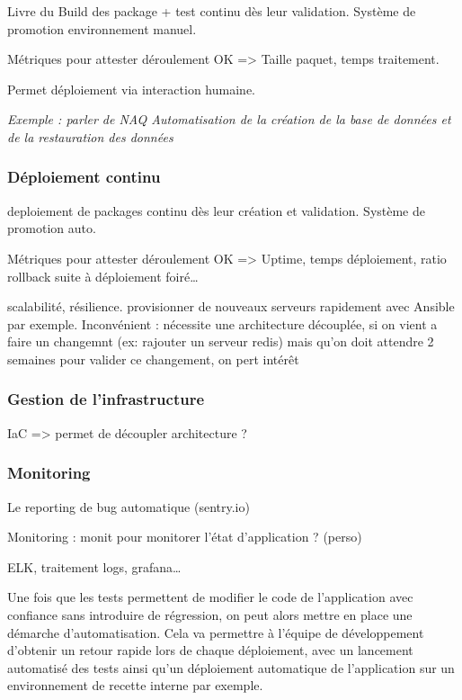 Livre du Build des package + test continu dès leur validation. Système de promotion environnement manuel.

Métriques pour attester déroulement OK => Taille paquet, temps traitement. 

Permet déploiement via interaction humaine.

\textit{Exemple : parler de NAQ Automatisation de la création de la base de données et de la restauration des données}

\subsubsection{Déploiement continu}

deploiement de packages continu dès leur création et validation. Système de promotion auto.

Métriques pour attester déroulement OK => Uptime, temps déploiement, ratio rollback suite à déploiement foiré\ldots

scalabilité, résilience. provisionner de nouveaux serveurs rapidement avec Ansible par exemple. Inconvénient : nécessite une architecture découplée, si on vient a faire un changemnt (ex: rajouter un serveur redis) mais qu'on doit attendre 2 semaines pour valider ce changement, on pert intérêt

\subsubsection{Gestion de l'infrastructure}

\gls{IaC} => permet de découpler architecture ? %

\subsubsection{Monitoring}

Le reporting de bug automatique (sentry.io)

Monitoring : monit pour monitorer l'état d'application ? (perso)

ELK, traitement logs, grafana\ldots

Une fois que les tests permettent de modifier le code de l'application avec confiance sans introduire de régression, on peut alors mettre en place une démarche d'automatisation. Cela va permettre à l'équipe de développement d'obtenir un retour rapide lors de chaque déploiement, avec un lancement automatisé des tests ainsi qu'un déploiement automatique de l'application sur un environnement de recette interne par exemple.

